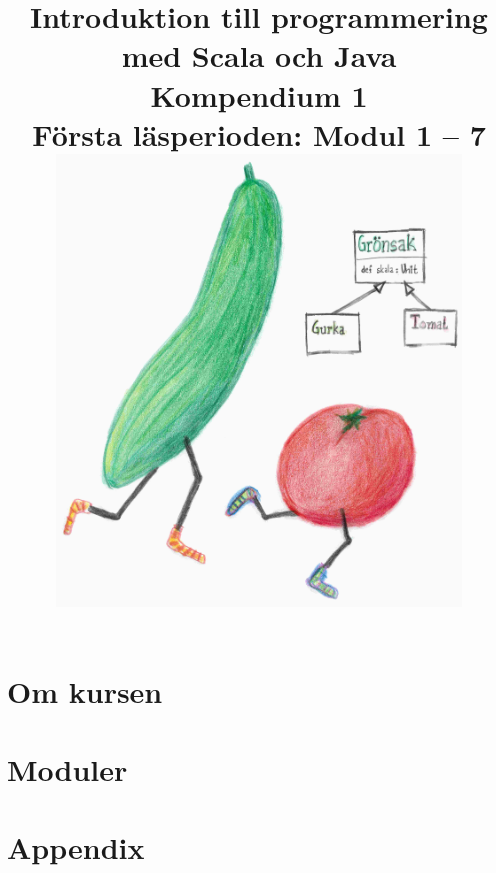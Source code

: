 \documentclass[a4paper]{compendium}
\title{
{\vspace{-3.0cm}\bf\sffamily\Huge\selectfont  Introduktion till programmering med Scala och Java}
\\ \vspace{2em}%
{\sffamily \textbf{Kompendium 1}\\Första läsperioden: Modul 1 -- 7}\\\vspace{2cm}
\includegraphics[height=12cm]{cover/gurka.jpg}
}
\date{\raggedbottom%
\vspace{-2em}\begin{minipage}{1.0\textwidth}\centering
EDAA45, Lp1-2, HT 2016\\
Datavetenskap, LTH\\
Lunds Universitet\\
~\\
Kompileringsdatum: \today \\
\url{http://cs.lth.se/pgk}
\end{minipage}
}
\newcommand{\SlideHeading}[1]{\section*{#1}}
\begin{document}

\frontmatter
\maketitle




\setcounter{tocdepth}{2} %
\tableofcontents
\mainmatter



\part{Om kursen}
\setcounter{chapter}{-3}





\part{Moduler}




























\part{Appendix}
\appendix








\end{document}
